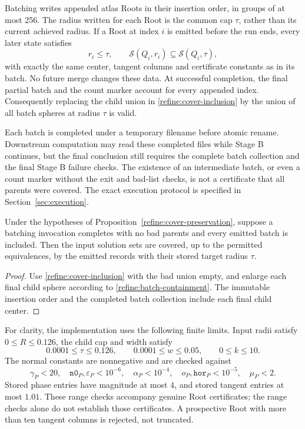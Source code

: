 Batching writes appended atlas Roots in their insertion order, in
groups of at most 256.  The radius written for each Root is the common
cap $\tau$, rather than its current achieved radius.  If a Root at
index $i$ is emitted before the run ends, every later state satisfies
\begin{equation}\label{refine:batch-containment}
 r_i\leq\tau,
 \qquad\mathcal S(Q_i,r_i)\subseteq\mathcal S(Q_i,\tau),
\end{equation}
with exactly the same center, tangent columns and certificate constants
as in its batch.  No future merge changes these data.  At successful
completion, the final partial batch and the count marker account for
every appended index.  Consequently replacing the child union in
\eqref{refine:cover-inclusion} by the union of all batch spheres at
radius $\tau$ is valid.

Each batch is completed under a temporary filename before atomic
rename.  Downstream computation may read these completed files while
Stage B continues, but the final conclusion still requires the complete
batch collection and the final Stage B failure checks.  The existence
of an intermediate batch, or even a count marker without the exit and
bad-list checks, is not a certificate that all parents were covered.
The exact execution protocol is specified in
Section~\ref{sec:execution}.

\begin{corollary}\label{refine:batch-cover}
Under the hypotheses of Proposition~\ref{refine:cover-preservation},
suppose a batching invocation completes with no bad parents and every
emitted batch is included.  Then the input solution sets are covered,
up to the permitted equivalences, by the emitted records with their
stored target radius $\tau$.
\end{corollary}

\begin{proof}
Use \eqref{refine:cover-inclusion} with the bad union empty, and enlarge
each final child sphere according to \eqref{refine:batch-containment}.
The immutable insertion order and the completed batch collection
include each final child center.
\end{proof}

For clarity, the implementation uses the following finite limits.
Input radii satisfy $0\leq R\leq0.126$, the child cap and width satisfy
\[
 0.0001\leq\tau\leq0.126,
 \qquad 0.0001\leq w\leq0.05,
 \qquad 0\leq k\leq10.
\]
The normal constants are nonnegative and are checked against
\[
 \gamma_P<20,\quad
 \mathtt{n0}_P,\varepsilon_P<10^{-6},\quad
 \alpha_P<10^{-4},\quad
 o_P,\mathtt{hor}_P<10^{-5},\quad
 \mu_P<2.
\]
Stored phase entries have magnitude at most $4$, and stored tangent
entries at most $1.01$.  These range checks accompany genuine Root
certificates; the range checks alone do not establish those
certificates.  A prospective Root with more than ten tangent columns
is rejected, not truncated.

